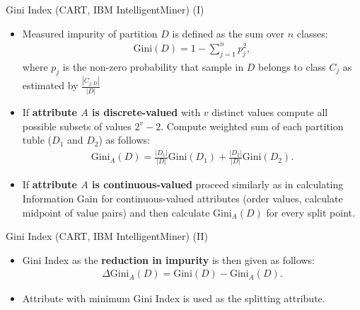 \begin{frame}{Gini Index (CART, IBM IntelligentMiner) (I)}
	\begin{itemize}
		\item Measured impurity of partition $D$ is defined as the sum over $n$ classes:
		      \begin{align*}
			      \text{Gini}(D) = 1-\sum_{j=1}^{n} p_j^2,
		      \end{align*}
		      where $p_j$ is the non-zero probability that sample in $D$ belongs to class $C_j$ as estimated by $\frac{|C_{j,D}|}{|D|}$
		\item If \textbf{attribute $A$ is discrete-valued} with $v$ distinct values
		      compute all possible subsets of values $2^v - 2$. Compute weighted sum of
		      each partition tuble ($D_1$ and $D_2$) as follows:
		      \begin{align*}
			      \text{Gini}_A(D) = \frac{|D_1|}{|D|}\text{Gini}(D_1)+\frac{|D_2|}{|D|}\text{Gini}(D_2).
		      \end{align*}
		\item If \textbf{attribute $A$ is continuous-valued} proceed similarly as in
		      calculating Information Gain for continuous-valued attributes (order values,
		      calculate midpoint of value pairs) and then calculate $\text{Gini}_A(D)$ for
		      every split point.
	\end{itemize}
\end{frame}

\begin{frame}{Gini Index (CART, IBM IntelligentMiner) (II)}
	\begin{itemize}
		\item Gini Index as the \textbf{reduction in impurity} is then given as
		      follows:
		      \begin{align*}
			      \Delta\text{Gini}_A(D) = \text{Gini}(D)-\text{Gini}_A(D).
		      \end{align*}
		\item Attribute with minimum Gini Index is used as the splitting attribute.
	\end{itemize}

\end{frame}

